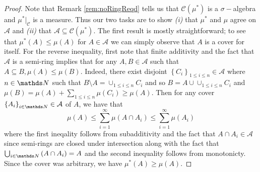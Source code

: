 \begin{proof}
Note that Remark \ref{rem:noRingReqd} tells us that $\mathcal{C}\left(\mu^{*}\right)$
is a $\sigma-$algebra and $\mu^{*}|_{\mathcal{C}}$ is a measure.
Thus our two tasks are to show \emph{(i)} that $\mu^{*}$ and $\mu$
agree on\emph{ $\mathcal{A}$ }and\emph{ (ii)} that $\mathcal{A}\subseteq\mathcal{C}\left(\mu^{*}\right)$.
The first result is mostly straightforward; to see that $\mu^{*}\left(A\right)\leq\mu\left(A\right)$
for $A\in\mathcal{A}$ we can simply observe that $A$ is a cover
for itself. For the reverse inequality, first note that finite additivity
and the fact that $\mathcal{A}$ is a semi-ring implies that for any
$A,B\in\mathcal{A}$ such that $A\subseteq B,\mu\left(A\right)\leq\mu\left(B\right).$
Indeed, there exist disjoint $\left\{ C_{i}\right\} _{1\leq i\leq n}\in\mathcal{A}$
where $n\in\N$ such that $B\setminus A=\cup_{1\leq i\leq n}C_{i}$
and so $B=A\cup\cup_{1\leq i\leq n}C_{i}$ and $\mu\left(B\right)=\mu\left(A\right)+\sum_{1\leq i\leq n}\mu\left(C_{i}\right)\geq\mu\left(A\right).$
Then for any cover $\left\{ A_{i}\right\} _{i\in\N}\in\mathcal{A}$
of $A$, we have that 
\[
\mu\left(A\right)\leq\sum_{i=1}^{\infty}\mu\left(A\cap A_{i}\right)\leq\sum_{i=1}^{\infty}\mu\left(A_{i}\right)
\]
where the first ineqality follows from subadditivity and the fact
that $A\cap A_{i}\in\mathcal{A}$ since semi-rings are closed under
intersection along with the fact that $\bigcup_{i\in\N}\left(A\cap A_{i}\right)=A$
and the second inequality follows from monotonicty. Since the cover
was arbitrary, we have $\mu^{*}\left(A\right)\geq\mu\left(A\right).$


\end{proof}
